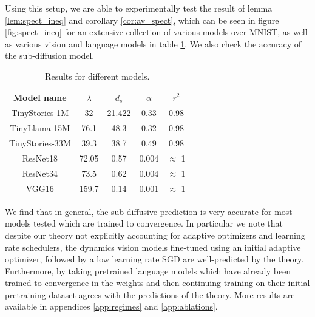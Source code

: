 \documentclass{article} %
\theoremstyle{definition}
\begin{document}
 Using this setup, we are able to experimentally test the result of lemma \ref{lem:spect_ineq} and corollary \ref{cor:av_spect}, which can be seen in figure \ref{fig:spect_ineq} for an extensive collection of various models over MNIST, as well as various vision and language models in table \ref{tab:model_results}. We also check the accuracy of the sub-diffusion model.

\begin{table}[h]
    \centering
    \begin{tabular}{c c c c c}
        \hline
        Model name & $\lambda$ & $d_s$ & $\alpha$ & $r^2$ \\
        \hline
        TinyStories-1M & 32 & 21.422 & 0.33 & 0.98 \\
        TinyLlama-15M & 76.1 & 48.3 & 0.32 & 0.98 \\
        TinyStories-33M & 39.3 & 38.7 & 0.49 & 0.98 \\
        ResNet18 & 72.05 & 0.57 & 0.004 & $\approx$ 1 \\
        ResNet34 & 73.5 & 0.62 & 0.004 & $\approx$ 1 \\
        VGG16 & 159.7 & 0.14 & 0.001 & $\approx$ 1 \\
        \hline
    \end{tabular}
    \caption{Results for different models.}
    \label{tab:model_results}
\end{table}

We find that in general, the sub-diffusive prediction is very accurate for most models tested which are trained to convergence. In particular we note that despite our theory not explicitly accounting for adaptive optimizers and learning rate schedulers, the dynamics vision models fine-tuned using an initial adaptive optimizer, followed by a low learning rate SGD are well-predicted by the theory. Furthermore, by taking pretrained language models which have already been trained to convergence in the weights and then continuing training on their initial pretraining dataset agrees with the predictions of the theory. More results are available in appendices \ref{app:regimes} and \ref{app:ablations}.
\end{document}
